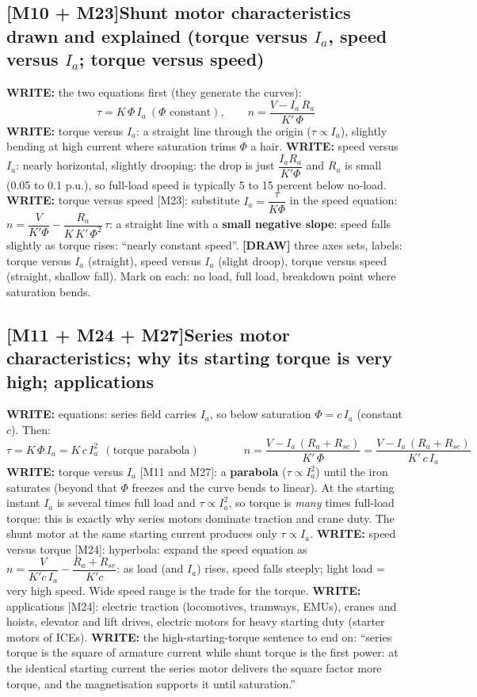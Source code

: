 \documentclass[11pt]{article}
\newcommand{\q}[2]{\subsection*{\color{copper}#1\quad\color{iron}#2}}
\newcommand{\w}[1]{\textbf{\color{copper}WRITE:} #1}
\newcommand{\dw}[1]{\textbf{\color{muted}[DRAW]} #1}
\begin{document}
\q{[M10 + M23]}{Shunt motor characteristics drawn and explained (torque versus $I_a$, speed versus $I_a$; torque versus speed)}
\w{the two equations first (they generate the curves):}
\[
\tau = K\,\Phi\, I_a\ (\Phi \text{ constant}), \qquad n = \dfrac{V - I_a\, R_a}{K'\, \Phi}
\]
\w{torque versus $I_a$:} a straight line through the origin ($\tau \propto I_a$), slightly bending at high current where saturation trims $\Phi$ a hair.
\w{speed versus $I_a$:} nearly horizontal, slightly drooping: the drop is just $\dfrac{I_a R_a}{K' \Phi}$ and $R_a$ is small (0.05 to 0.1 p.u.), so full-load speed is typically 5 to 15 percent below no-load.
\w{torque versus speed [M23]:} substitute $I_a = \dfrac{\tau}{K \Phi}$ in the speed equation: $n = \dfrac{V}{K' \Phi} - \dfrac{R_a}{K\, K'\, \Phi^{2}}\, \tau$: a straight line with a \textbf{small negative slope}: speed falls slightly as torque rises: ``nearly constant speed''.
\dw{three axes sets, labels: torque versus $I_a$ (straight), speed versus $I_a$ (slight droop), torque versus speed (straight, shallow fall). Mark on each: no load, full load, breakdown point where saturation bends.}

\q{[M11 + M24 + M27]}{Series motor characteristics; why its starting torque is very high; applications}
\w{equations:} series field carries $I_a$, so below saturation $\Phi = c\, I_a$ (constant $c$). Then:
\[
\tau = K\,\Phi\, I_a = K\, c\, I_a^2 \ \ (\text{torque parabola})
\qquad\qquad
n = \dfrac{V - I_a\,(R_a + R_{se})}{K'\, \Phi} = \dfrac{V - I_a\,(R_a + R_{se})}{K'\, c\, I_a}
\]
\w{torque versus $I_a$ [M11 and M27]:} a \textbf{parabola} ($\tau \propto I_a^{2}$) until the iron saturates (beyond that $\Phi$ freezes and the curve bends to linear). At the starting instant $I_a$ is several times full load and $\tau \propto I_a^{2}$, so torque is \emph{many} times full-load torque: this is exactly why series motors dominate traction and crane duty. The shunt motor at the same starting current produces only $\tau \propto I_a$.
\w{speed versus torque [M24]:} hyperbola: expand the speed equation as $n = \dfrac{V}{K' c\, I_a} - \dfrac{R_a + R_{se}}{K' c}$: as load (and $I_a$) rises, speed falls steeply; light load = very high speed. Wide speed range is the trade for the torque.
\w{applications [M24]:} electric traction (locomotives, tramways, EMUs), cranes and hoists, elevator and lift drives, electric motors for heavy starting duty (starter motors of ICEs).
\w{the high-starting-torque sentence to end on:} ``series torque is the square of armature current while shunt torque is the first power: at the identical starting current the series motor delivers the square factor more torque, and the magnetisation supports it until saturation.''
\end{document}
